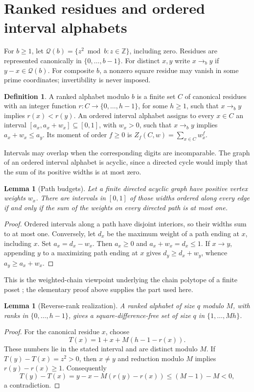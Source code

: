 \documentclass[11pt]{article}
\newtheorem{lemma}[theorem]{Lemma}
\theoremstyle{definition}
\newtheorem{definition}[theorem]{Definition}
\theoremstyle{remark}
\newcommand{\Z}{\mathbb Z}
\newcommand{\QR}{\mathcal Q}
\begin{document}
\section{Ranked residues and ordered interval alphabets}\label{sec:ranked}
For $b\ge1$, let
$\QR(b)=\{z^2\bmod b:z\in\Z\}$, including zero. Residues are represented
canonically in $\{0,\ldots,b-1\}$. For distinct $x,y$ write $x\to_b y$ if
$y-x\in\QR(b)$. For composite $b$, a nonzero square residue may vanish
in some prime coordinates; invertibility is never imposed.

\begin{definition}
A ranked alphabet modulo $b$ is a finite set $C$ of canonical residues
with an integer function $r:C\to\{0,\ldots,h-1\}$, for some $h\ge1$,
such that $x\to_b y$ implies $r(x)<r(y)$.
An ordered interval alphabet assigns to every $x\in C$ an interval
$[a_x,a_x+w_x]\subseteq[0,1]$, with $w_x>0$, such that
$x\to_b y$ implies $a_x+w_x\le a_y$.
Its moment of order $f\ge0$ is $Z_f(C,w)=\sum_{x\in C}w_x^f$.
\end{definition}

Intervals may overlap when the corresponding digits are incomparable. The
graph of an ordered interval alphabet is acyclic, since a directed cycle
would imply that the sum of its positive widths is at most zero.

\begin{lemma}[Path budgets]\label{lem:paths}
Let a finite directed acyclic graph have positive vertex weights $w_x$.
There are intervals in $[0,1]$ of those widths ordered along every edge
if and only if the sum of the weights on every directed path is at most one.
\end{lemma}
\begin{proof}
Ordered intervals along a path have disjoint interiors, so their widths
sum to at most one. Conversely, let $d_x$ be the maximum weight of a path
ending at $x$, including $x$. Set $a_x=d_x-w_x$. Then $a_x\ge0$ and
$a_x+w_x=d_x\le1$. If $x\to y$, appending $y$ to a maximizing path ending
at $x$ gives $d_y\ge d_x+w_y$, whence $a_y\ge a_x+w_x$.
\end{proof}
This is the weighted-chain viewpoint underlying the chain polytope of a
finite poset \cite{Stanley1986}; the elementary proof above supplies the
part used here.

\begin{lemma}[Reverse-rank realization]\label{lem:reverse}
A ranked alphabet of size $q$ modulo $M$, with ranks in
$\{0,\ldots,h-1\}$, gives a square-difference-free set of size $q$ in
$\{1,\ldots,Mh\}$.
\end{lemma}
\begin{proof}
For the canonical residue $x$, choose
\[
 T(x)=1+x+M(h-1-r(x)).
\]
These numbers lie in the stated interval and are distinct modulo $M$.
If $T(y)-T(x)=z^2>0$, then $x\ne y$ and reduction modulo $M$ implies
$r(y)-r(x)\ge1$. Consequently
\[
 T(y)-T(x)=y-x-M(r(y)-r(x))\le(M-1)-M<0,
\]
a contradiction.
\end{proof}
\end{document}
